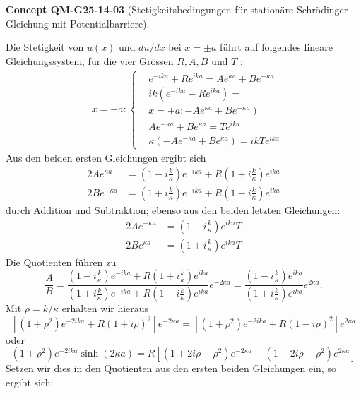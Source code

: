 \documentclass[10pt, letterpaper]{article}
\newcommand{\CustomHeading}[3]{%
  \par\medskip\noindent%
  \textbf{#1 #2} \textnormal{(#3)}.\enskip%
}
\newenvironment{CONC}[2]{\begin{unitbox}\CustomHeading{Concept}{#1}{#2}}{\end{unitbox}}
\begin{document}
\begin{CONC}{QM-G25-14-03}{Stetigkeitsbedingungen für stationäre Schrödinger-Gleichung mit Potentialbarriere}
Die Stetigkeit von $u(x)$ und $d u / d x$ bei $x= \pm a$ führt auf folgendes lineare Gleichungssystem, für die vier Grössen $R, A, B$ und $T$ :
$$
\begin{aligned}
& x=-a:\left\{\begin{aligned}
& e^{-i k a}+R e^{i k a}=A e^{\kappa a}+B e^{-\kappa a} \\
& i k\left(e^{-i k a}-R e^{i k a}\right)= \\
&\left.x=+a:-A e^{\kappa a}+B e^{-\kappa a}\right) \\
& A e^{-\kappa a}+B e^{\kappa a}=T e^{i k a} \\
& \kappa\left(-A e^{-\kappa a}+B e^{\kappa a}\right)=i k T e^{i k a}
\end{aligned}\right.
\end{aligned}
$$
Aus den beiden ersten Gleichungen ergibt sich
$$
\begin{aligned}
2 A e^{\kappa a} & =\left(1-i \frac{k}{\kappa}\right) e^{-i k a}+R\left(1+i \frac{k}{\kappa}\right) e^{i k a} \\
2 B e^{-\kappa a} & =\left(1+i \frac{k}{\kappa}\right) e^{-i k a}+R\left(1-i \frac{k}{\kappa}\right) e^{i k a}
\end{aligned}
$$
durch Addition und Subtraktion; ebenso aus den beiden letzten Gleichungen:
$$
\begin{aligned}
2 A e^{-\kappa a} & =\left(1-i \frac{k}{\kappa}\right) e^{i k a} T \\
2 B e^{\kappa a} & =\left(1+i \frac{k}{\kappa}\right) e^{i k a} T
\end{aligned}
$$
Die Quotienten führen zu
$$
\frac{A}{B}=\frac{\left(1-i \frac{k}{\kappa}\right) e^{-i k a}+R\left(1+i \frac{k}{\kappa}\right) e^{i k a}}{\left(1+i \frac{k}{\kappa}\right) e^{-i k a}+R\left(1-i \frac{k}{\kappa}\right) e^{i k a}} e^{-2 \kappa a}=\frac{\left(1-i \frac{k}{\kappa}\right) e^{i k a}}{\left(1+i \frac{k}{\kappa}\right) e^{i k a}} e^{2 \kappa a} .
$$
Mit $\rho=k / \kappa$ erhalten wir hieraus
$$
\left[\left(1+\rho^{2}\right) e^{-2 i k a}+R(1+i \rho)^{2}\right] e^{-2 \kappa a}=\left[\left(1+\rho^{2}\right) e^{-2 i k a}+R(1-i \rho)^{2}\right] e^{2 \kappa a}
$$
oder
$$
\left(1+\rho^{2}\right) e^{-2 i k a} \sinh (2 \kappa a)=R\left[\left(1+2 i \rho-\rho^{2}\right) e^{-2 \kappa a}-\left(1-2 i \rho-\rho^{2}\right) e^{2 \kappa a}\right]
$$
Setzen wir dies in den Quotienten aus den ersten beiden Gleichungen ein, so ergibt sich:

\end{CONC}
\end{document}
